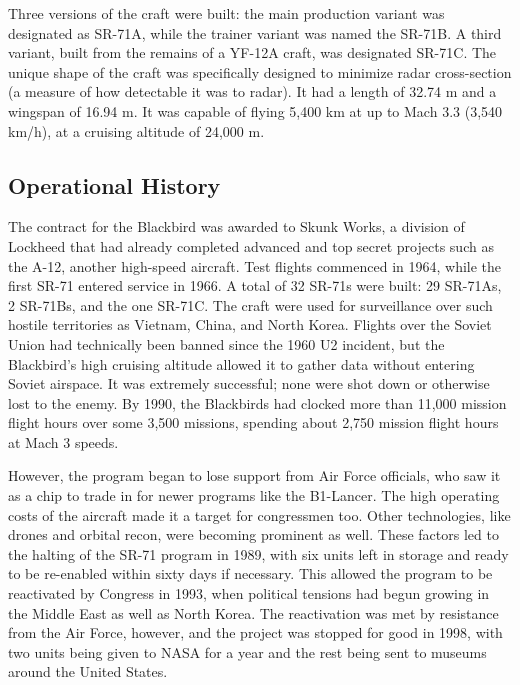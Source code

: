 \documentclass[12pt, draftclsnofoot, onecolumn]{IEEEtran}
\begin{document}
	Three versions of the craft were built: the main production variant was designated as SR-71A, while the trainer variant was named the SR-71B. A third variant, built from the remains of a YF-12A craft, was designated SR-71C.
	The unique shape of the craft was specifically designed to minimize radar cross-section (a measure of how detectable it was to radar). It had a length of 32.74 m and a wingspan of 16.94 m. It was capable of flying 5,400 km at up to Mach 3.3 (3,540 km/h), at a cruising altitude of 24,000 m.


	\subsection*{Operational History}
	The contract for the Blackbird was awarded to Skunk Works, a division of Lockheed that had already completed advanced and top secret projects such as the A-12, another high-speed aircraft. Test flights commenced in 1964, while the first SR-71 entered service in 1966. A total of 32 SR-71s were built: 29 SR-71As, 2 SR-71Bs, and the one SR-71C. The craft were used for surveillance over such hostile territories as Vietnam, China, and North Korea. Flights over the Soviet Union had technically been banned since the 1960 U2 incident, but the Blackbird's high cruising altitude allowed it to gather data without entering Soviet airspace. It was extremely successful; none were shot down or otherwise lost to the enemy. By 1990, the Blackbirds had clocked more than 11,000 mission flight hours over some 3,500 missions, spending about 2,750 mission flight hours at Mach 3 speeds\cite{stats}.

	However, the program began to lose support from Air Force officials, who saw it as a chip to trade in for newer programs like the B1-Lancer. The high operating costs of the aircraft made it a target for congressmen too\cite{stats}. Other technologies, like drones and orbital recon, were becoming prominent as well. These factors led to the halting of the SR-71 program in 1989, with six units left in storage and ready to be re-enabled within sixty days if necessary. This allowed the program to be reactivated by Congress in 1993, when political tensions had begun growing in the Middle East as well as North Korea\cite{retirement}. The reactivation was met by resistance from the Air Force, however, and the project was stopped for good in 1998, with two units being given to NASA for a year and the rest being sent to museums around the United States.
	
\end{document}
